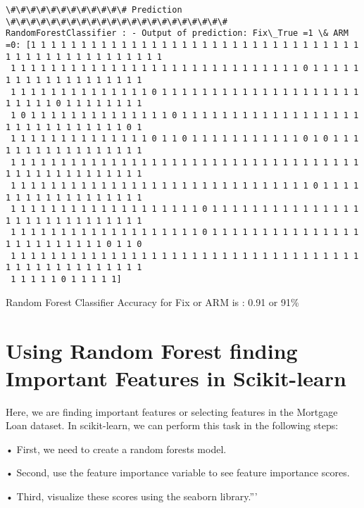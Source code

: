 \documentclass[11pt]{article}
\begin{document}
\begin{Verbatim}[commandchars=\\\{\}]
\#\#\#\#\#\#\#\#\#\#\#\# Prediction  \#\#\#\#\#\#\#\#\#\#\#\#\#\#\#\#\#\#\#\#\#\#
RandomForestClassifier : - Output of prediction: Fix\_True =1 \& ARM =0: [1 1 1 1 1 1 1 1 1 1 1 1 1 1 1 1 1 1 1 1 1 1 1 1 1 1 1 1 1 1 1 1 1 1 1 1 1 1 1 1 1 1 1 1 1 1 1 1 1
 1 1 1 1 1 1 1 1 1 1 1 1 1 1 1 1 1 1 1 1 1 1 1 1 1 1 1 1 1 0 1 1 1 1 1 1 1 1 1 1 1 1 1 1 1 1 1 1 1
 1 1 1 1 1 1 1 1 1 1 1 1 1 1 0 1 1 1 1 1 1 1 1 1 1 1 1 1 1 1 1 1 1 1 1 1 1 1 1 1 0 1 1 1 1 1 1 1 1
 1 0 1 1 1 1 1 1 1 1 1 1 1 1 1 1 0 1 1 1 1 1 1 1 1 1 1 1 1 1 1 1 1 1 1 1 1 1 1 1 1 1 1 1 1 1 1 0 1
 1 1 1 1 1 1 1 1 1 1 1 1 1 1 0 1 1 0 1 1 1 1 1 1 1 1 1 1 1 0 1 0 1 1 1 1 1 1 1 1 1 1 1 1 1 1 1 1 1
 1 1 1 1 1 1 1 1 1 1 1 1 1 1 1 1 1 1 1 1 1 1 1 1 1 1 1 1 1 1 1 1 1 1 1 1 1 1 1 1 1 1 1 1 1 1 1 1 1
 1 1 1 1 1 1 1 1 1 1 1 1 1 1 1 1 1 1 1 1 1 1 1 1 1 1 1 1 1 1 0 1 1 1 1 1 1 1 1 1 1 1 1 1 1 1 1 1 1
 1 1 1 1 1 1 1 1 1 1 1 1 1 1 1 1 1 1 1 0 1 1 1 1 1 1 1 1 1 1 1 1 1 1 1 1 1 1 1 1 1 1 1 1 1 1 1 1 1
 1 1 1 1 1 1 1 1 1 1 1 1 1 1 1 1 1 1 1 0 1 1 1 1 1 1 1 1 1 1 1 1 1 1 1 1 1 1 1 1 1 1 1 1 1 0 1 1 0
 1 1 1 1 1 1 1 1 1 1 1 1 1 1 1 1 1 1 1 1 1 1 1 1 1 1 1 1 1 1 1 1 1 1 1 1 1 1 1 1 1 1 1 1 1 1 1 1 1
 1 1 1 1 1 0 1 1 1 1 1]

    \end{Verbatim}

    Random Forest Classifier Accuracy for Fix or ARM is : 0.91 or 91\%

    \section{Using Random Forest finding Important Features in
Scikit-learn}\label{using-random-forest-finding-important-features-in-scikit-learn}

Here, we are finding important features or selecting features in the
Mortgage Loan dataset. In scikit-learn, we can perform this task in the
following steps:

• First, we need to create a random forests model.

• Second, use the feature importance variable to see feature importance
scores.

• Third, visualize these scores using the seaborn library.'''
\end{document}
